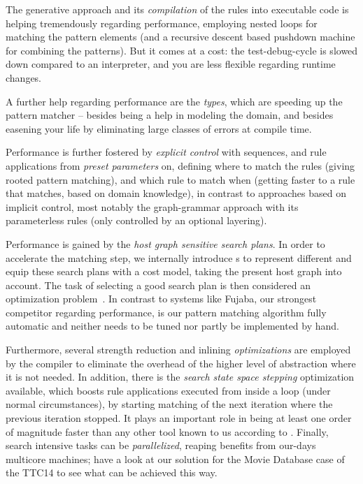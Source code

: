 The generative approach and its \emph{compilation} of the rules into executable code is helping tremendously regarding performance, employing nested loops for matching the pattern elements (and a recursive descent based pushdown machine for combining the patterns).
But it comes at a cost: the test-debug-cycle is slowed down compared to an interpreter, and you are less flexible regarding runtime changes.

A further help regarding performance are the \emph{types}, which are speeding up the pattern matcher
-- besides being a help in modeling the domain, and besides easening your life by eliminating large classes of errors at compile time.

Performance is further fostered by \emph{explicit control} with sequences, and rule applications from \emph{preset parameters} on, defining where to match the rules (giving rooted pattern matching), and which rule to match when (getting faster to a rule that matches, based on domain knowledge), in contrast to approaches based on implicit control, most notably the graph-grammar approach with its parameterless rules (only controlled by an optional layering). 

Performance is gained by the \emph{host graph sensitive search plans}.
In order to accelerate the matching step, we internally introduce s
to represent different  and equip these search plans with a cost model, taking the present host graph into account.
The task of selecting a good search plan is then considered an optimization problem~\cite{BKG:07,Bat:06}.
In contrast to systems like Fujaba\cite{fujaba,fuj}, our strongest competitor regarding performance,
is our pattern matching algorithm fully automatic and neither needs to be tuned nor partly be implemented by hand.

Furthermore, several strength reduction and inlining \emph{optimizations} are employed by the compiler to eliminate the overhead of the higher level of abstraction where it is not needed.
In addition, there is the \emph{search state space stepping} optimization available, 
which boosts rule applications executed from inside a loop (under normal circumstances), by starting matching of the next iteration where the previous iteration stopped.
It plays an important role in being at least one order of magnitude faster than any other tool known to us according to \cite{varro_bench}.
Finally, search intensive tasks can be \emph{parallelized}, reaping benefits from our-days multicore machines; have a look at our solution for the Movie Database case of the TTC14\cite{MovieDatabase} to see what can be achieved this way.

